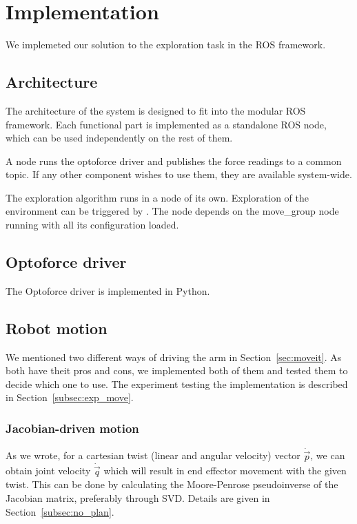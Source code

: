 \documentclass[buriama8_dp.tex]{subfiles}
\begin{document}
\chapter{Implementation}

We implemeted our solution to the exploration task in the ROS framework.

\section{Architecture}
\label{sec:impl_arch}

The architecture of the system is designed to fit into the modular ROS framework. Each functional part is implemented as a standalone ROS node, which can be used independently on the rest of them.

A node runs the optoforce driver and publishes the force readings to a common topic. If any other component wishes to use them, they are available system-wide.

The exploration algorithm runs in a node of its own. Exploration of the environment can be triggered by . The node depends on the move\_group node running with all its configuration loaded.


\section{Optoforce driver}
\label{sec:opto_driver}

The Optoforce driver is implemented in Python. 

\section{Robot motion}
\label{sec:rob_impl}

We mentioned two different ways of driving the arm in Section~\ref{sec:moveit}. As both have theit pros and cons, we implemented both of them and tested them to decide which one to use. The experiment testing the implementation is described in Section~\ref{subsec:exp_move}.

\subsection{Jacobian-driven motion}
\label{subsec:impl_drv_jacob}

As we wrote, for a cartesian twist (linear and angular velocity) vector \(\dot{\vec p}\), we can obtain joint velocity \(\dot{\vec q}\) which will result in end effector movement with the given twist. This can be done by calculating the Moore-Penrose pseudoinverse of the Jacobian matrix, preferably through SVD. Details are given in Section~\ref{subsec:no_plan}.
\end{document}
